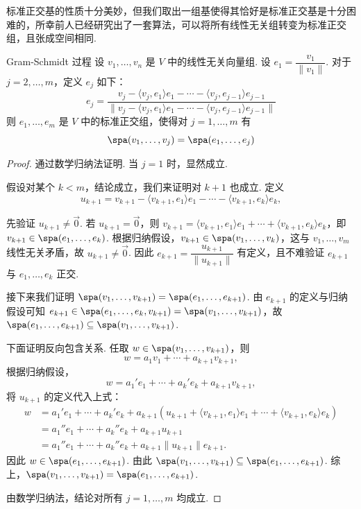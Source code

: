 标准正交基的性质十分美妙，但我们取出一组基使得其恰好是标准正交基是十分困难的，所幸前人已经研究出了一套算法，可以将所有线性无关组转变为标准正交组，且张成空间相同.

\begin{theorem}{Gram-Schmidt 过程}{} 
    设 $v_1, \ldots ,v_n$ 是 $ V $ 中的线性无关向量组. 设 $e_1 = \dfrac{v_1}{\lVert v_1 \rVert}$. 对于 $ j = 2, \ldots , m$，定义 $ e_j $ 如下：
    \[ e_j = \frac{v_j - \langle v_j, e_1 \rangle e_1 - \cdots - \langle v_j, e_{j - 1} \rangle e_{j - 1} }{\lVert v_j - \langle v_j, e_1 \rangle e_1 - \cdots - \langle v_j, e_{j - 1} \rangle e_{j - 1} \rVert}\]
    则 $e_1, \ldots , e_m $ 是 $ V $ 中的标准正交组，使得对 $ j = 1, \ldots , m $ 有
    \[ \spa(v_1, \ldots, v_j) = \spa(e_1, \ldots, e_j) \]
\end{theorem}

\begin{proof}
    通过数学归纳法证明. 当 $ j = 1 $ 时，显然成立.

    假设对某个 $ k < m $，结论成立，我们来证明对 $ k + 1 $ 也成立. 定义
    \[ u_{k + 1} = v_{k + 1} - \langle v_{k + 1}, e_1 \rangle e_1 - \cdots - \langle v_{k + 1}, e_k \rangle e_k, \]

    先验证 $ u_{k + 1} \neq \vec{0} $. 若 $ u_{k + 1} = \vec{0} $，则 $v_{k + 1} = \langle v_{k + 1}, e_1 \rangle e_1 + \cdots + \langle v_{k + 1}, e_k \rangle e_k$，即 $ v_{k + 1} \in \spa(e_1, \ldots , e_k)$. 根据归纳假设，$ v_{k + 1} \in \spa(v_1, \ldots , v_k)$，这与 $ v_1, \ldots , v_m $ 线性无关矛盾，故 $ u_{k + 1} \neq \vec{0} $. 因此 $e_{k + 1} = \dfrac{u_{k + 1}}{\lVert u_{k + 1} \rVert}$ 有定义，且不难验证 $ e_{k + 1} $ 与 $ e_1, \ldots , e_k $ 正交.

    接下来我们证明 $\spa(v_1, \ldots , v_{k + 1}) = \spa(e_1, \ldots , e_{k + 1})$. 由 $e_{k+1}$ 的定义与归纳假设可知 $e_{k+1}\in \spa(e_1, \ldots , e_k, v_{k+1}) = \spa(v_1, \ldots , v_{k + 1})$，故 $\spa(e_1, \ldots , e_{k + 1}) \subseteq \spa(v_1, \ldots , v_{k + 1})$.

    下面证明反向包含关系. 任取 $ w \in \spa(v_1, \ldots , v_{k + 1})$，则
    \[ w = a_1 v_1 + \cdots + a_{k + 1} v_{k + 1}, \]
    根据归纳假设，
    \[ w = a_1' e_1 + \cdots + a_k' e_k + a_{k + 1} v_{k + 1}, \]
    将 $ u_{k + 1} $ 的定义代入上式：
    \begin{align*}
        w & = a_1' e_1 + \cdots + a_k' e_k + a_{k + 1} \left( u_{k + 1} + \langle v_{k + 1}, e_1 \rangle e_1 + \cdots + \langle v_{k + 1}, e_k \rangle e_k \right) \\
          & = a_1'' e_1 + \cdots + a_k'' e_k + a_{k + 1} u_{k + 1} \\
          & = a_1'' e_1 + \cdots + a_k'' e_k + a_{k + 1} \lVert u_{k + 1} \rVert e_{k + 1}.
    \end{align*}
    因此 $ w \in \spa(e_1, \ldots , e_{k + 1})$. 由此 $\spa(v_1, \ldots , v_{k + 1}) \subseteq \spa(e_1, \ldots , e_{k + 1})$. 综上，$\spa(v_1, \ldots , v_{k + 1}) = \spa(e_1, \ldots , e_{k + 1})$.

    由数学归纳法，结论对所有 $ j = 1, \ldots , m $ 均成立.
\end{proof}

